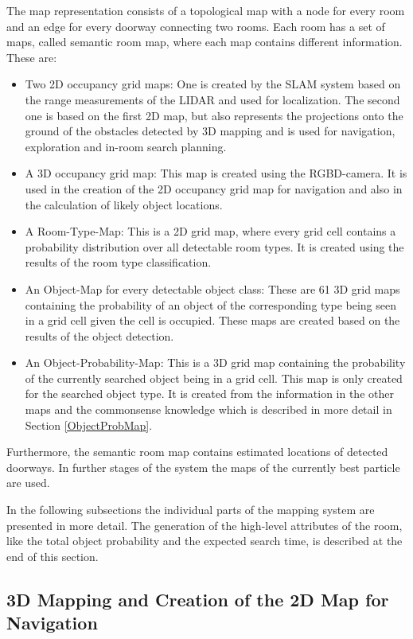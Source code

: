 The map representation consists of a topological map with a node for every room and an edge for every doorway connecting two rooms. Each room has a set of maps, called semantic room map, where each map contains different information. These are:
\begin{itemize}
 \item Two 2D occupancy grid maps: One is created by the SLAM system based on the range measurements of the LIDAR and used for localization. The second one is based on the first 2D map, but also represents the projections onto the ground of the obstacles detected by 3D mapping  and is used for navigation, exploration and in-room search planning.
 \item A 3D occupancy grid map: This map is created using the RGBD-camera. It is used in the creation of the 2D occupancy grid map for navigation and also in the calculation of likely object locations.
 \item A Room-Type-Map: This is a 2D grid map, where every grid cell contains a probability distribution over all detectable room types. It is created using the results of the room type classification.
 \item An Object-Map for every detectable object class: These are 61 3D grid maps containing the probability of an object of the corresponding type being seen in a grid cell given the cell is occupied. These maps are created based on the results of the object detection.
 \item An Object-Probability-Map: This is a 3D grid map containing the probability of the currently searched object being in a grid cell. This map is only created for the searched object type. It is created from the information in the other maps and the commonsense knowledge which is described in more detail in Section \ref{ObjectProbMap}.
\end{itemize}

Furthermore, the semantic room map contains estimated locations of detected doorways. In further stages of the system the maps of the currently best particle are used.

In the following subsections the individual parts of the mapping system are presented in more detail. The generation of the high-level attributes of the room, like the total object probability and the expected search time, is described at the end of this section.

\subsection{3D Mapping and Creation of the 2D Map for Navigation }

